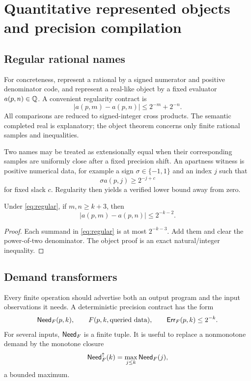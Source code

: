 \section{Quantitative represented objects and precision compilation}\label{sec:quantitative}

\subsection{Regular rational names}

For concreteness, represent a rational by a signed numerator and positive denominator code, and represent a real-like object by a fixed evaluator \(a(p,n)\in\mathbb{Q}\).  A convenient regularity contract is
\begin{equation}
 |a(p,m)-a(p,n)|\leq 2^{-m}+2^{-n}. \tag{R}\label{eq:regular}
\end{equation}
All comparisons are reduced to signed-integer cross products.  The semantic completed real is explanatory; the object theorem concerns only finite rational samples and inequalities.

Two names may be treated as extensionally equal when their corresponding samples are uniformly close after a fixed precision shift.  An apartness witness is positive numerical data, for example a sign \(\sigma\in\{-1,1\}\) and an index \(j\) such that
\[
  \sigma a(p,j)\geq 2^{-j+c}
\]
for fixed slack \(c\).  Regularity then yields a verified lower bound away from zero.

\begin{lemma}
Under \eqref{eq:regular}, if \(m,n\geq k+3\), then
\[
  |a(p,m)-a(p,n)|\leq 2^{-k-2}.
\]
\end{lemma}

\begin{proof}
Each summand in \eqref{eq:regular} is at most \(2^{-k-3}\).  Add them and clear the power-of-two denominator.  The object proof is an exact natural/integer inequality.
\end{proof}

\subsection{Demand transformers}

Every finite operation should advertise both an output program and the input observations it needs.  A deterministic precision contract has the form
\[
  \mathsf{Need}_F(p,k),\qquad F(p,k,\text{queried data}),\qquad
  \mathsf{Err}_F(p,k)\leq 2^{-k}.
\]
For several inputs, \(\mathsf{Need}_F\) is a finite tuple.  It is useful to replace a nonmonotone demand by the monotone closure
\[
  \mathsf{Need}_F^{\uparrow}(k)=\max_{j\leq k}\mathsf{Need}_F(j),
\]
a bounded maximum.

